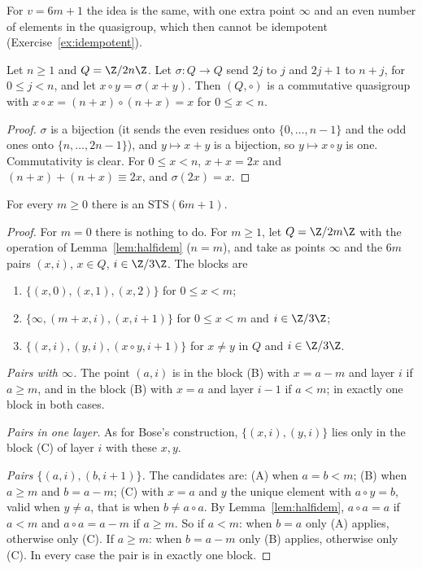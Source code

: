 For $v=6m+1$ the idea is the same, with one extra point $\infty$ and an even number of elements in the quasigroup, which then cannot be idempotent (Exercise~\ref{ex:idempotent}).

\begin{lemma}\label{lem:halfidem}
Let $n\ge1$ and $Q=\Z/2n\Z$. Let $\sigma:Q\to Q$ send $2j$ to $j$ and $2j+1$ to $n+j$, for $0\le j<n$, and let $x\circ y=\sigma(x+y)$. Then $(Q,\circ)$ is a commutative quasigroup
with $x\circ x=(n+x)\circ(n+x)=x$ for $0\le x<n$.
\end{lemma}
\begin{proof}
$\sigma$ is a bijection (it sends the even residues onto $\{0,\dots,n-1\}$ and the odd ones onto $\{n,\dots,2n-1\}$), and $y\mapsto x+y$ is a bijection, so $y\mapsto x\circ y$ is one.
Commutativity is clear. For $0\le x<n$, $x+x=2x$ and $(n+x)+(n+x)\equiv2x$, and $\sigma(2x)=x$.
\end{proof}

\begin{theorem}[Skolem, 1958]\label{thm:skolem}
For every $m\ge0$ there is an $\mathrm{STS}(6m+1)$.
\end{theorem}
\begin{proof}
For $m=0$ there is nothing to do. For $m\ge1$, let $Q=\Z/2m\Z$ with the operation of Lemma~\ref{lem:halfidem} ($n=m$), and take as points $\infty$ and the $6m$ pairs $(x,i)$, $x\in Q$, $i\in\Z/3\Z$.
The blocks are
\begin{enumerate}[label=(\Alph*)]
\item $\{(x,0),(x,1),(x,2)\}$ for $0\le x<m$;
\item $\{\infty,(m+x,i),(x,i+1)\}$ for $0\le x<m$ and $i\in\Z/3\Z$;
\item $\{(x,i),(y,i),(x\circ y,i+1)\}$ for $x\ne y$ in $Q$ and $i\in\Z/3\Z$.
\end{enumerate}
\emph{Pairs with $\infty$.} The point $(a,i)$ is in the block (B) with $x=a-m$ and layer $i$ if $a\ge m$, and in the block (B) with $x=a$ and layer $i-1$ if $a<m$; in exactly one block in both cases.

\emph{Pairs in one layer.} As for Bose's construction, $\{(x,i),(y,i)\}$ lies only in the block (C) of layer $i$ with these $x,y$.

\emph{Pairs $\{(a,i),(b,i+1)\}$.} The candidates are: (A) when $a=b<m$; (B) when $a\ge m$ and $b=a-m$; (C) with $x=a$ and $y$ the unique element with $a\circ y=b$, valid when $y\ne a$, that is
when $b\ne a\circ a$. By Lemma~\ref{lem:halfidem}, $a\circ a=a$ if $a<m$ and $a\circ a=a-m$ if $a\ge m$. So if $a<m$: when $b=a$ only (A) applies, otherwise only (C). If $a\ge m$: when $b=a-m$ only (B)
applies, otherwise only (C). In every case the pair is in exactly one block.
\end{proof}

